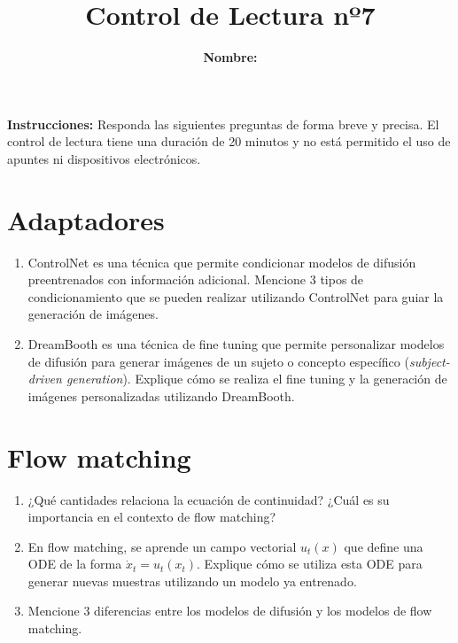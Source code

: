 \documentclass{article}
\title{\bfseries{Control de Lectura nº7}\vspace{0.5cm}}
\author{\textbf{Nombre:} \rule{12cm}{0.4pt}}
\begin{document}
\maketitle

\hspace{-0.5cm}\textbf{Instrucciones:} Responda las siguientes preguntas de forma breve y precisa. El control de lectura tiene una duración de 20 minutos y no está permitido el uso de apuntes ni dispositivos electrónicos.

\section*{Adaptadores}
\begin{enumerate}[{\bf P1.}]
	\item ControlNet es una técnica que permite condicionar modelos de difusión preentrenados con información adicional. Mencione 3 tipos de condicionamiento que se pueden realizar utilizando ControlNet para guiar la generación de imágenes.
	\item DreamBooth es una técnica de fine tuning que permite personalizar modelos de difusión para generar imágenes de un sujeto o concepto específico (\textit{subject-driven generation}). Explique cómo se realiza el fine tuning y la generación de imágenes personalizadas utilizando DreamBooth.
\end{enumerate}

\section*{Flow matching}
\begin{enumerate}[{\bf P1.}]
	\item ¿Qué cantidades relaciona la ecuación de continuidad? ¿Cuál es su importancia en el contexto de flow matching?
	\item En flow matching, se aprende un campo vectorial $u_t(x)$ que define una ODE de la forma $\dot x_t = u_t(x_t)$. Explique cómo se utiliza esta ODE para generar nuevas muestras utilizando un modelo ya entrenado.
	\item Mencione 3 diferencias entre los modelos de difusión y los modelos de flow matching.
\end{enumerate}
\end{document}
